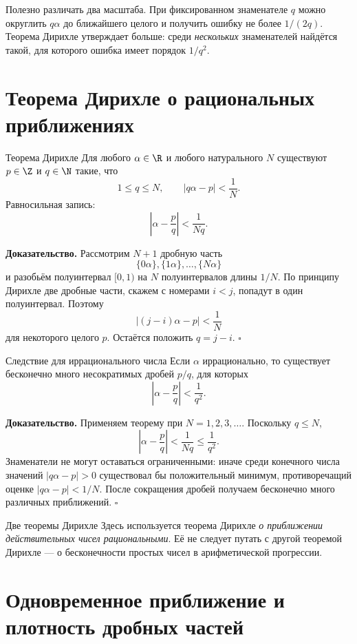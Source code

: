 Полезно различать два масштаба. При фиксированном знаменателе $q$
можно округлить $q\alpha$ до ближайшего целого и получить ошибку
не более $1/(2q)$. Теорема Дирихле утверждает больше: среди
\emph{нескольких} знаменателей найдётся такой, для которого ошибка
имеет порядок $1/q^2$.

\section{Теорема Дирихле о рациональных приближениях}

\begin{theorembox}{Теорема Дирихле}
Для любого $\alpha\in\R$ и любого натурального $N$ существуют
$p\in\Z$ и $q\in\N$ такие, что
\[
  1\le q\le N,
  \qquad
  |q\alpha-p|<\frac1N.
\]
Равносильная запись:
\[
  \left|\alpha-\frac pq\right|<\frac1{Nq}.
\]
\end{theorembox}

\textbf{Доказательство.}
Рассмотрим $N+1$ дробную часть
\[
  \{0\alpha\},\{1\alpha\},\ldots,\{N\alpha\}
\]
и разобьём полуинтервал $[0,1)$ на $N$ полуинтервалов длины $1/N$.
По принципу Дирихле две дробные части, скажем с номерами $i<j$,
попадут в один полуинтервал. Поэтому
\[
  |(j-i)\alpha-p|<\frac1N
\]
для некоторого целого $p$. Остаётся положить $q=j-i$. \hfill$\square$

\begin{theorembox}{Следствие для иррационального числа}
Если $\alpha$ иррационально, то существует бесконечно много
несократимых дробей $p/q$, для которых
\[
  \left|\alpha-\frac pq\right|<\frac1{q^2}.
\]
\end{theorembox}

\textbf{Доказательство.}
Применяем теорему при $N=1,2,3,\ldots$. Поскольку $q\le N$,
\[
  \left|\alpha-\frac pq\right|<\frac1{Nq}\le\frac1{q^2}.
\]
Знаменатели не могут оставаться ограниченными: иначе среди конечного
числа значений $|q\alpha-p|>0$ существовал бы положительный минимум,
противоречащий оценке $|q\alpha-p|<1/N$. После сокращения дробей
получаем бесконечно много различных приближений. \hfill$\square$

\begin{commentbox}{Две теоремы Дирихле}
Здесь используется теорема Дирихле \emph{о приближении действительных
чисел рациональными}. Её не следует путать с другой теоремой
Дирихле --- о бесконечности простых чисел в арифметической прогрессии.
\end{commentbox}

\section{Одновременное приближение и плотность дробных частей}

